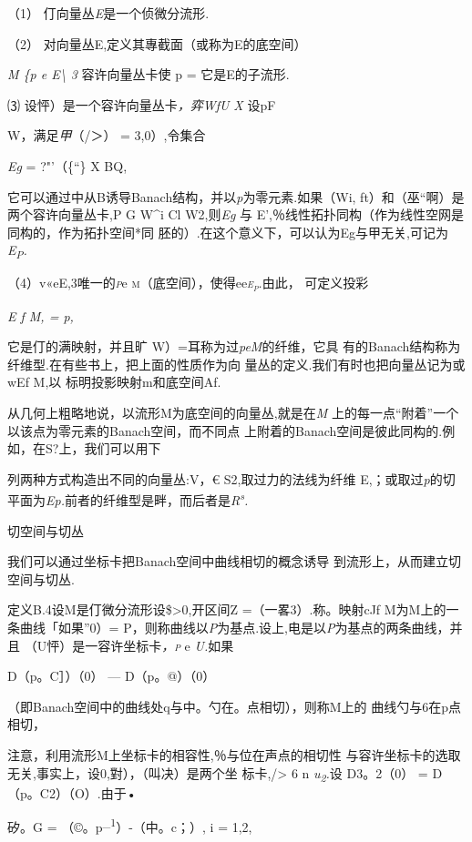 （1） 仃向量丛\emph{E}是一个侦微分流形.

（2） 对向量丛E,定义其專截面（或称为E的底空间）

\emph{M \{p e E\textbackslash{} 3} 容许向量丛卡使 p = 它是E的子流形.

⑶ 设怦）是一个容许向量丛卡\emph{，弈WfU X} 设pF

W，满足\emph{甲}（/＞） = 3,0）,令集合

\emph{Eg} = ?"'（\{``\} X BQ,

它可以通过中从B诱导Banach结构，并以\emph{p}为零元素.如果（Wi,
ft）和（巫``啊）是两个容许向量丛卡,P G W\^{}i Cl W2,则\emph{Eg} 与
E',％线性拓扑同构（作为线性空网是同构的，作为拓扑空间*同
胚的）.在这个意义下，可以认为Eg与甲无关,可记为\emph{E\textsubscript{P}.}

（4）v«eE,3唯一的\emph{\textsc{p}}e
\textsc{m}（底空间），使得ee\emph{\textsc{e\textsubscript{p}.}}由此，
可定义投彩

\emph{E f M, = p,}

它是仃的满映射，并且旷 W）=耳称为过\emph{peM}的纤维，它具
有的Banach结构称为纤维型.在有些书上，把上面的性质作为向
量丛的定义.我们有时也把向量丛记为或wEf M,以 标明投影映射m和底空间Af.

从几何上粗略地说，以流形M为底空间的向量丛,就是在\emph{M}
上的每一点``附着''一个以该点为零元素的Banach空间，而不同点
上附着的Banach空间是彼此同构的.例如，在S?上，我们可以用下

列两种方式构造出不同的向量丛:V，€ S2,取过力的法线为纤维
E,；或取过\emph{p}的切平面为\emph{Ep.}前者的纤维型是畔，而后者是\emph{R\textsuperscript{s}.}

切空间与切丛

我们可以通过坐标卡把Banach空间中曲线相切的概念诱导
到流形上，从而建立切空间与切丛.

定义B.4设M是仃微分流形设\$\textgreater{}0,开区间Z =（一畧3）.称。映射cJf
M为M上的一条曲线「如果''0）=
P，则称曲线以\emph{P}为基点.设上,电是以\emph{P}为基点的两条曲线，并且
（U怦）是一容许坐标卡\emph{\textsc{，p}} e \emph{U.}如果

D（p。C］）（0） --- D（p。@）（0）

（即Banach空间中的曲线处q与中。勺在。点相切），则称M上的
曲线勺与6在p点相切，

注意，利用流形M上坐标卡的相容性,％与位在声点的相切性
与容许坐标卡的选取无关,事实上，设0,對），（叫决）是两个坐
标卡,/\textgreater{} 6 n \emph{u\textsubscript{2}.}设 D3。2（0） =
D（p。C2）（O）.由于•

矽。G = （©。p\textsuperscript{\_1}）-（中。c；）, i = 1,2,

